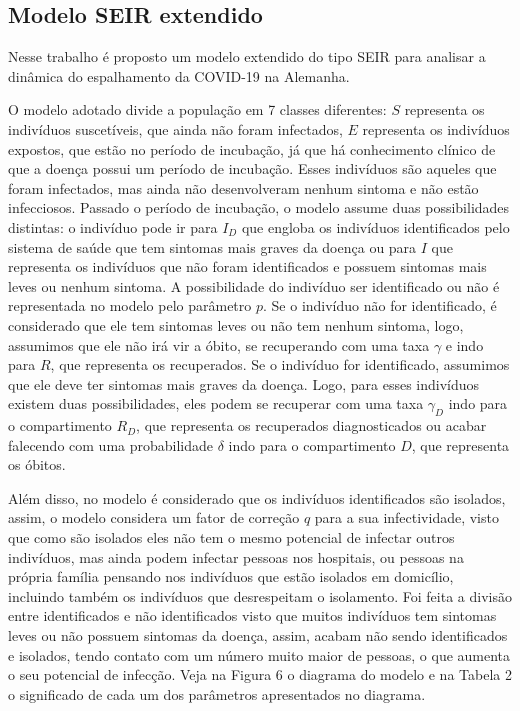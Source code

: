\documentclass[12pt]{article}
\begin{document}
\newpage
\subsection{Modelo SEIR extendido}
Nesse trabalho é proposto um modelo extendido do tipo SEIR para analisar a dinâmica do espalhamento da COVID-19 na Alemanha.

O modelo adotado  divide a população em 7 classes diferentes: $S$ representa os indivíduos suscetíveis, que ainda não foram infectados, $E$ representa os indivíduos expostos, que estão no período de incubação, já que há conhecimento clínico de que a doença possui um período de incubação. Esses indivíduos são aqueles que foram infectados, mas ainda não desenvolveram nenhum sintoma e não estão infecciosos. Passado o período de incubação,   o modelo assume duas possibilidades distintas: o indivíduo pode ir para $I_D$ que engloba os indivíduos identificados pelo sistema de saúde que tem sintomas mais graves da doença ou para $I$ que representa os indivíduos que não foram identificados e possuem sintomas mais leves ou nenhum sintoma. A possibilidade do indivíduo ser identificado ou não é representada no modelo pelo parâmetro $p$. Se o indivíduo não for identificado, é considerado que ele tem sintomas leves ou não tem nenhum sintoma, logo, assumimos que ele não irá vir a óbito, se recuperando com uma taxa $\gamma$  e indo para $R$, que representa os recuperados. Se o indivíduo for identificado, assumimos que ele deve ter sintomas mais graves da doença. Logo, para esses indivíduos existem duas possibilidades, eles podem se recuperar com uma taxa $\gamma_D$ indo para o compartimento $R_D$, que representa os recuperados diagnosticados ou acabar falecendo com uma probabilidade $\delta$ indo para o compartimento $D$, que representa os óbitos. 


Além disso, no modelo é considerado que os indivíduos identificados são isolados, assim, o modelo considera um fator de correção $q$ para a sua infectividade, visto que como são isolados eles não tem o mesmo potencial de infectar outros indivíduos, mas ainda podem infectar pessoas nos hospitais, ou pessoas na própria família pensando nos indivíduos que estão isolados em domicílio, incluindo também os indivíduos que desrespeitam o isolamento.  Foi feita a divisão entre identificados e não identificados visto que muitos indivíduos tem sintomas leves ou não possuem sintomas da doença, assim, acabam não sendo identificados e isolados, tendo contato com um número muito maior de pessoas, o que aumenta o seu potencial de infecção. Veja na Figura 6 o diagrama do modelo e na Tabela 2 o significado de cada um dos parâmetros apresentados no diagrama.
\end{document}

